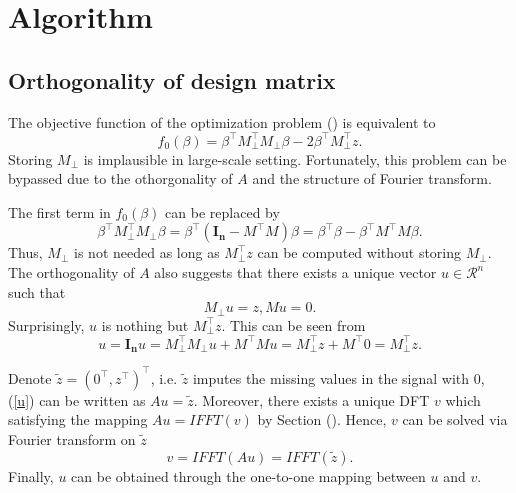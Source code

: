 \documentclass[final,onefignum,onetabnum]{siamart190516}
\begin{document}
\section{Algorithm}
\subsection{Orthogonality of design matrix}
The objective function of the optimization problem () is equivalent to
\begin{equation}
    f_0(\beta) =  \beta^{\top} M_{\perp}^{\top} M_{\perp}\beta -2\beta^{\top} M_{\perp}^{\top} z.
\end{equation}
Storing $M_{\perp}$ is implausible in large-scale setting. Fortunately, this problem can be bypassed due to the othorgonality of $A$ and the structure of Fourier transform.

The first term in $f_0(\beta)$ can be replaced by 
\begin{equation}
    \beta^{\top} M_{\perp}^{\top} M_{\perp}\beta = \beta^{\top}(\mathbf{I_n}-M^{\top}M)\beta = \beta^{\top}\beta - \beta^{\top}M^{\top}M\beta.
\end{equation}
Thus, $M_{\perp}$ is not needed as long as $M_{\perp}^{\top}z$ can be computed without storing $M_{\perp}$.
The orthogonality of $A$ also suggests that there exists a unique vector $u\in \mathcal{R}^{n}$ such that
\begin{equation}\label{u}
    M_{\perp}u = z, Mu = 0.
\end{equation}
Surprisingly, $u$ is nothing but $M_{\perp}^{\top}z$. This can be seen from
\begin{equation}
    u = \mathbf{I_n}u = M_{\perp}^{\top} M_{\perp}u +  M^{\top}Mu = M_{\perp}^{\top}z + M^{\top}0 = M_{\perp}^{\top}z.
\end{equation}

Denote $\widetilde{z} = (0^{\top}, z^{\top})^{\top}$, i.e. $\widetilde{z}$ imputes the missing values in the signal with 0, (\ref{u}) can be written as $Au = \widetilde{z}$. Moreover, there exists a unique DFT $v$ which satisfying the mapping $Au = IFFT(v)$ by Section (). Hence, $v$ can be solved via Fourier transform on $\widetilde{z}$
\begin{equation}
    v = IFFT(Au) = IFFT(\widetilde{z}).
\end{equation}
Finally, $u$ can be obtained through the one-to-one mapping between $u$ and $v$.
\end{document}
